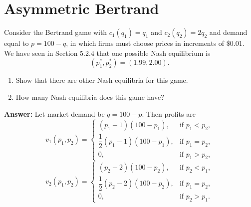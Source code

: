 \documentclass[12pt,a4paper]{article}
\begin{document}
\section{Asymmetric Bertrand}
Consider the Bertrand game with $c_1(q_1)=q_1$ and $c_2(q_2)=2q_2$ and demand equal to $p=100-q$, in which firms must choose prices in increments of \$0.01. We have seen in Section 5.2.4 that one possible Nash equilibrium is
\[
    (p_1^*,p_2^*)=(1.99,2.00).
\]
\begin{enumerate}[label=(\alph*)]
  \item Show that there are other Nash equilibria for this game.
  \item How many Nash equilibria does this game have?
\end{enumerate}

\vspace{0.5cm}

\noindent\textbf{Answer:} Let market demand be $q=100-p$. Then profits are
\[
    v_1(p_1,p_2)=
    \begin{cases}
        (p_1-1)(100-p_1), & \text{if } p_1<p_2,\\
        \dfrac12 (p_1-1)(100-p_1), & \text{if } p_1=p_2,\\
        0, & \text{if } p_1>p_2,
    \end{cases}
\]
\[
    v_2(p_1,p_2)=
    \begin{cases}
        (p_2-2)(100-p_2), & \text{if } p_2<p_1,\\
        \dfrac12 (p_2-2)(100-p_2), & \text{if } p_1=p_2,\\
        0, & \text{if } p_2>p_1.
    \end{cases}
\]
\end{document}
